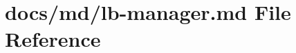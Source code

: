 \hypertarget{lb-manager_8md}{}\section{docs/md/lb-\/manager.md File Reference}
\label{lb-manager_8md}
